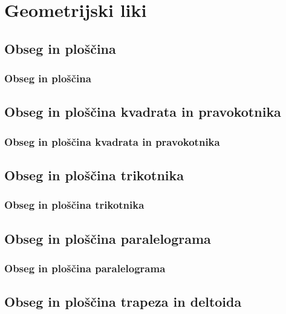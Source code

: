 \section{Geometrijski liki}

\begin{frame}
    \sectionpage
\end{frame}

\begin{frame}
\end{frame}

    \subsection{Obseg in ploščina}

        \begin{frame}
            \frametitle{Obseg in ploščina}
        \end{frame}

    \subsection{Obseg in ploščina kvadrata in pravokotnika}

        \begin{frame}
            \frametitle{Obseg in ploščina kvadrata in pravokotnika}
        \end{frame}

    \subsection{Obseg in ploščina trikotnika}

        \begin{frame}
            \frametitle{Obseg in ploščina trikotnika}
        \end{frame}

    \subsection{Obseg in ploščina paralelograma}

        \begin{frame}
            \frametitle{Obseg in ploščina paralelograma}
        \end{frame}

    \subsection{Obseg in ploščina trapeza in deltoida}

